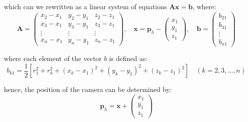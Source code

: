 \documentclass[a4paper]{article}
\begin{document}
\noindent which can we rewritten as a linear system of equations
$\bm{Ax} = \bm{b}$, where:
\begin{equation}
    \bm{A} = \begin{pmatrix}
            x_2 - x_1 & y_2 - y_1 & z_2 - z_1 \\
            x_3 - x_1 & y_3 - y_1 & z_3 - z_1 \\
            \vdots & \vdots & \vdots \\
            x_n - x_1 & y_n - y_1 & z_n - z_1
        \end{pmatrix}, \quad
    \bm{x} =
        \bm{p}_h - 
        \begin{pmatrix}
            x_1 \\
            y_1 \\
            z_1
        \end{pmatrix}, \quad 
    \bm{b} = \begin{pmatrix}
            b_{21} \\
            b_{31} \\
            \vdots \\
            b_{n1}
        \end{pmatrix}
\end{equation}

\noindent where each element of the vector $b$ is defined as:
\begin{equation}
    b_{k1} = \frac{1}{2}\left[ r_1^2 + r_k^2 + (x_k - x_1)^2 + (y_k - y_1)^2 + (z_k - z_1)^2 \right] \quad (k = 2, 3, \dots, n)
\end{equation}

\noindent hence, the position of the camera can be determined by:
\begin{equation}
    \bm{p}_h
        =
    \bm{x} + 
    \begin{pmatrix}
        x_1 \\
        y_1 \\
        z_1 
    \end{pmatrix}
\end{equation}
\end{document}
